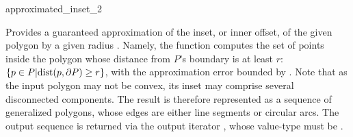 
\ccRefPageBegin

\begin{ccRefFunction}{approximated_inset_2}


   {Provides a guaranteed approximation of the inset, or inner offset, of
    the given polygon  by a given radius . Namely, the
    function computes the set of points inside the polygon whose distance
    from $P$'s boundary is at least $r$:
    $\{ p \in P \vert {\rm dist}(p, \partial P) \geq r \}$,
    with the approximation error bounded by .
    Note that as the input polygon may not be convex, its inset may comprise
    several disconnected components. The result is therefore represented as a
    sequence of generalized polygons, whose edges are either line segments or
    circular arcs.
    The output sequence is returned via the output iterator , whose
    value-type must be .
    }

\end{ccRefFunction}

\ccRefPageEnd
